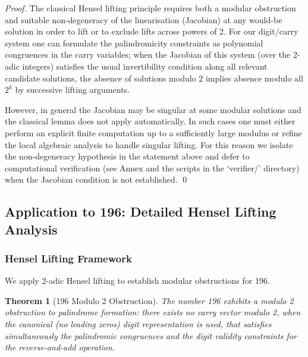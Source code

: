\documentclass[12pt,a4paper]{article}
\newtheorem{theorem}{Theorem}[section]
\begin{document}
\begin{proof}
The classical Hensel lifting principle requires both a modular obstruction and suitable non-degeneracy of the linearisation (Jacobian) at any would-be solution in order to lift or to exclude lifts across powers of 2. For our digit/carry system one can formulate the palindromicity constraints as polynomial congruences in the carry variables; when the Jacobian of this system (over the 2-adic integers) satisfies the usual invertibility condition along all relevant candidate solutions, the absence of solutions modulo $2$ implies absence modulo all $2^k$ by successive lifting arguments.

However, in general the Jacobian may be singular at some modular solutions and the classical lemma does not apply automatically. In such cases one must either perform an explicit finite computation up to a sufficiently large modulus or refine the local algebraic analysis to handle singular lifting. For this reason we isolate the non-degeneracy hypothesis in the statement above and defer to computational verification (see Annex and the scripts in the `verifier/' directory) when the Jacobian condition is not established.
\qed
\end{proof}

\subsection{Application to 196: Detailed Hensel Lifting Analysis}

\subsubsection{Hensel Lifting Framework}

We apply 2-adic Hensel lifting to establish modular obstructions for 196.

\begin{theorem}[196 Modulo 2 Obstruction]%
The number 196 exhibits a modulo 2 obstruction to palindrome formation: there exists no carry vector modulo 2, when the canonical (no leading zeros) digit representation is used, that satisfies simultaneously the palindromic congruences and the digit validity constraints for the reverse-and-add operation.
\end{theorem}
\end{document}
